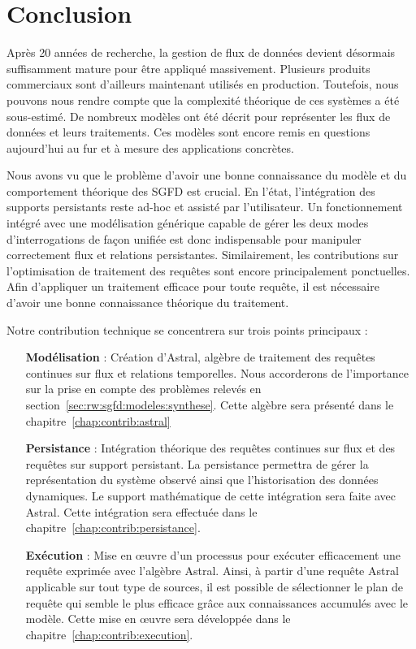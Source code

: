 \section{Conclusion}
Après 20 années de recherche, la gestion de flux de données devient désormais suffisamment mature pour être appliqué massivement. Plusieurs produits commerciaux sont d'ailleurs maintenant utilisés en production. Toutefois, nous pouvons nous rendre compte que la complexité théorique de ces systèmes a été sous-estimé. De nombreux modèles ont été décrit pour représenter les flux de données et leurs traitements. Ces modèles sont encore remis en questions aujourd'hui au fur et à mesure des applications concrètes. 

Nous avons vu que le problème d'avoir une bonne connaissance du modèle et du comportement théorique des SGFD est crucial. En l'état, l'intégration des supports persistants reste ad-hoc et assisté par l'utilisateur. Un fonctionnement intégré avec une modélisation générique capable de gérer les deux modes d'interrogations de façon unifiée est donc indispensable pour manipuler correctement flux et relations persistantes. Similairement, les contributions sur l'optimisation de traitement des requêtes sont encore principalement ponctuelles. Afin d'appliquer un traitement efficace pour toute requête, il est nécessaire d'avoir une bonne connaissance théorique du traitement.

Notre contribution technique se concentrera sur trois points principaux :
\begin{itemize}
 \item[\textbf{Modélisation}] : Création d'Astral, algèbre de traitement des requêtes continues sur flux et relations temporelles. Nous accorderons de l'importance sur la prise en compte des problèmes relevés en section~\ref{sec:rw:sgfd:modeles:synthese}. Cette algèbre sera présenté dans le chapitre~\ref{chap:contrib:astral}
 \item[\textbf{Persistance}] : Intégration théorique des requêtes continues sur flux et des requêtes sur support persistant. La persistance permettra de gérer la représentation du système observé ainsi que l'historisation des données dynamiques. Le support mathématique de cette intégration sera faite avec Astral. Cette intégration sera effectuée dans le chapitre~\ref{chap:contrib:persistance}.
 \item[\textbf{Exécution}] : Mise en œuvre d'un processus pour exécuter efficacement une requête exprimée avec l'algèbre Astral. Ainsi, à partir d'une requête Astral applicable sur tout type de sources, il est possible de sélectionner le plan de requête qui semble le plus efficace grâce aux connaissances accumulés avec le modèle. Cette mise en œuvre sera développée dans le chapitre~\ref{chap:contrib:execution}.
\end{itemize}

